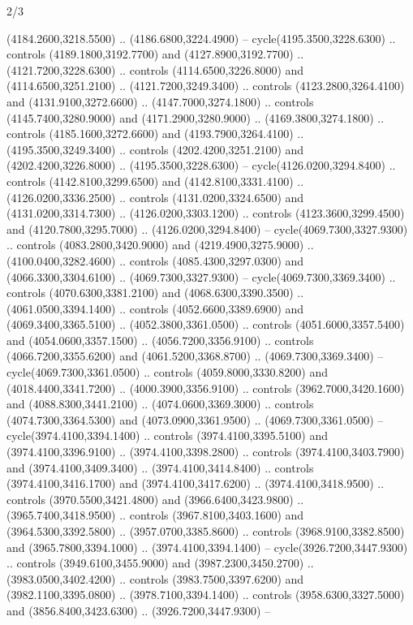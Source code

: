 \begin{flagdescription}{2/3}
\begin{scope}[shift={(0.5\flaglength,0.5)},scale=\flagwidth/130]
\begin{scope}[y=0.01mm, x=0.01mm,shift={(-3365,-2250)}]
  (4184.2600,3218.5500) .. (4186.6800,3224.4900) -- cycle(4195.3500,3228.6300)
  .. controls (4189.1800,3192.7700) and (4127.8900,3192.7700) ..
  (4121.7200,3228.6300) .. controls (4114.6500,3226.8000) and
  (4114.6500,3251.2100) .. (4121.7200,3249.3400) .. controls
  (4123.2800,3264.4100) and (4131.9100,3272.6600) .. (4147.7000,3274.1800) ..
  controls (4145.7400,3280.9000) and (4171.2900,3280.9000) ..
  (4169.3800,3274.1800) .. controls (4185.1600,3272.6600) and
  (4193.7900,3264.4100) .. (4195.3500,3249.3400) .. controls
  (4202.4200,3251.2100) and (4202.4200,3226.8000) .. (4195.3500,3228.6300) --
  cycle(4126.0200,3294.8400) .. controls (4142.8100,3299.6500) and
  (4142.8100,3331.4100) .. (4126.0200,3336.2500) .. controls
  (4131.0200,3324.6500) and (4131.0200,3314.7300) .. (4126.0200,3303.1200) ..
  controls (4123.3600,3299.4500) and (4120.7800,3295.7000) ..
  (4126.0200,3294.8400) -- cycle(4069.7300,3327.9300) .. controls
  (4083.2800,3420.9000) and (4219.4900,3275.9000) .. (4100.0400,3282.4600) ..
  controls (4085.4300,3297.0300) and (4066.3300,3304.6100) ..
  (4069.7300,3327.9300) -- cycle(4069.7300,3369.3400) .. controls
  (4070.6300,3381.2100) and (4068.6300,3390.3500) .. (4061.0500,3394.1400) ..
  controls (4052.6600,3389.6900) and (4069.3400,3365.5100) ..
  (4052.3800,3361.0500) .. controls (4051.6000,3357.5400) and
  (4054.0600,3357.1500) .. (4056.7200,3356.9100) .. controls
  (4066.7200,3355.6200) and (4061.5200,3368.8700) .. (4069.7300,3369.3400) --
  cycle(4069.7300,3361.0500) .. controls (4059.8000,3330.8200) and
  (4018.4400,3341.7200) .. (4000.3900,3356.9100) .. controls
  (3962.7000,3420.1600) and (4088.8300,3441.2100) .. (4074.0600,3369.3000) ..
  controls (4074.7300,3364.5300) and (4073.0900,3361.9500) ..
  (4069.7300,3361.0500) -- cycle(3974.4100,3394.1400) .. controls
  (3974.4100,3395.5100) and (3974.4100,3396.9100) .. (3974.4100,3398.2800) ..
  controls (3974.4100,3403.7900) and (3974.4100,3409.3400) ..
  (3974.4100,3414.8400) .. controls (3974.4100,3416.1700) and
  (3974.4100,3417.6200) .. (3974.4100,3418.9500) .. controls
  (3970.5500,3421.4800) and (3966.6400,3423.9800) .. (3965.7400,3418.9500) ..
  controls (3967.8100,3403.1600) and (3964.5300,3392.5800) ..
  (3957.0700,3385.8600) .. controls (3968.9100,3382.8500) and
  (3965.7800,3394.1000) .. (3974.4100,3394.1400) -- cycle(3926.7200,3447.9300)
  .. controls (3949.6100,3455.9000) and (3987.2300,3450.2700) ..
  (3983.0500,3402.4200) .. controls (3983.7500,3397.6200) and
  (3982.1100,3395.0800) .. (3978.7100,3394.1400) .. controls
  (3958.6300,3327.5000) and (3856.8400,3423.6300) .. (3926.7200,3447.9300) --

\end{scope}
\end{scope}
\end{flagdescription}
